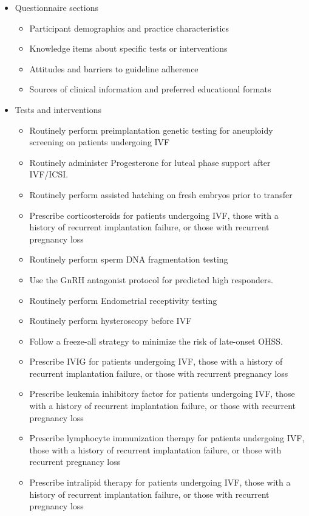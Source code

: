 \documentclass[
  letterpaper,
  DIV=11,
  numbers=noendperiod]{scrartcl}
\begin{document}
\begin{itemize}
\item
  Questionnaire sections

  \begin{itemize}
  \item
    Participant demographics and practice characteristics
  \item
    Knowledge items about specific tests or interventions
  \item
    Attitudes and barriers to guideline adherence
  \item
    Sources of clinical information and preferred educational formats
  \end{itemize}
\item
  Tests and interventions

  \begin{itemize}
  \item
    Routinely perform preimplantation genetic testing for aneuploidy
    screening on patients undergoing IVF
  \item
    Routinely administer Progesterone for luteal phase support after
    IVF/ICSI.
  \item
    Routinely perform assisted hatching on fresh embryos prior to
    transfer
  \item
    Prescribe corticosteroids for patients undergoing IVF, those with a
    history of recurrent implantation failure, or those with recurrent
    pregnancy loss
  \item
    Routinely perform sperm DNA fragmentation testing
  \item
    Use the GnRH antagonist protocol for predicted high responders.
  \item
    Routinely perform Endometrial receptivity testing
  \item
    Routinely perform hysteroscopy before IVF
  \item
    Follow a freeze-all strategy to minimize the risk of late-onset
    OHSS.
  \item
    Prescribe IVIG for patients undergoing IVF, those with a history of
    recurrent implantation failure, or those with recurrent pregnancy
    loss
  \item
    Prescribe leukemia inhibitory factor for patients undergoing IVF,
    those with a history of recurrent implantation failure, or those
    with recurrent pregnancy loss
  \item
    Prescribe lymphocyte immunization therapy for patients undergoing
    IVF, those with a history of recurrent implantation failure, or
    those with recurrent pregnancy loss
  \item
    Prescribe intralipid therapy for patients undergoing IVF, those with
    a history of recurrent implantation failure, or those with recurrent
    pregnancy loss
  \end{itemize}
\end{itemize}
\end{document}
